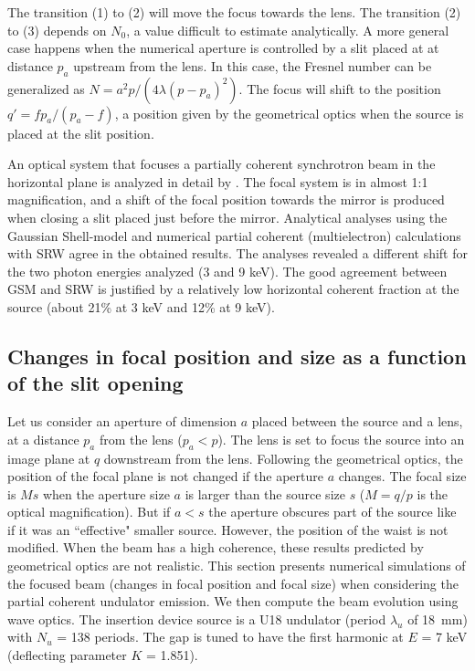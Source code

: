 \documentclass{iucr}              %
\begin{document}
The transition (1) to (2) will move the focus towards the lens. The transition (2) to (3) depends on $N_0$, a value difficult to estimate analytically. A more general case happens when the numerical aperture is controlled by a slit placed at at distance $p_a$ upstream from the lens. 
In this case, the Fresnel number can be generalized as $N=a^2 p / (4 \lambda (p-p_a)^2)$. The focus will shift to the position $q'=f p_a/(p_a-f)$, a position given by the geometrical optics when the source is placed at the slit position. 

An optical system that focuses a partially coherent synchrotron beam in the horizontal plane is analyzed in detail by . The focal system is in almost 1:1 magnification, and a shift of the focal position towards the mirror is produced when closing a slit placed just before the mirror. Analytical analyses using the Gaussian Shell-model and numerical partial coherent (multielectron) calculations with SRW \cite{codeSRW} agree in the obtained results. The analyses revealed a different shift for the two photon energies analyzed (3 and 9 keV). The good agreement between GSM and SRW is justified by a relatively low horizontal coherent fraction at the source (about 21\% at 3 keV and 12\% at 9 keV).
 
 
 \subsection{Changes in focal position and size as a function of the slit opening}
 
Let us consider an aperture of dimension $a$ placed between the source and a lens, at a distance $p_a$ from the lens ($p_a < p$). The lens is set to focus the source into an image plane at $q$ downstream from the lens. Following the geometrical optics, the position of the focal plane is not changed if the aperture $a$ changes. The focal size is $Ms$  when the aperture size $a$ is larger than the source size $s$ ($M=q/p$ is the optical magnification). But if $a<s$ the aperture obscures part of the source like if it was an ``effective" smaller source. However, the position of the waist is not modified. When the beam has a high coherence, these results predicted by geometrical optics are not realistic. This section presents numerical simulations of the focused beam (changes in focal position and focal size) when considering the partial coherent undulator emission. 
We then compute the beam evolution using wave optics. The insertion device source is a U18 undulator (period $\lambda_u$ of \SI{18}{\milli\meter}) with $N_u$ = 138 periods. The gap is tuned to have the first harmonic at $E$ = 7 keV (deflecting parameter $K$ = 1.851). 
\end{document}
